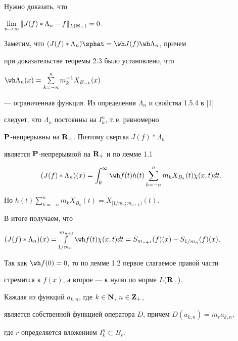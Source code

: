 \begin{pf}


Нужно доказать, что


$\lim\limits_{n\to\infty}\|J(f)*\Lambda_n-f\|_{L({\bold R}_+)}=0$.


Заметим, что $(J(f)*\Lambda_n){\sphat}={\wh J}(f){\wh\Lambda}_n$, причем 


при доказательстве теоремы 2.3 было установлено, что


${\wh\Lambda}_n(x)=\sum\limits^n_{k=-n}m_k^{-1}X_{B_{-k}}(x)$


--- ограниченная функция. Из определения $\Lambda_n$ и свойства 1.5.4 в [1] 


следует, что $\Lambda_n$ постоянны на $I^n_k$, т.\,е. равномерно 


$\bold P$-непрерывны на ${\bold R}_+$. Поэтому свертка $J(f)*\Lambda_n$ 


является $\bold P$-непрерывной на ${\bold R}_+$ и по лемме 1.1


$$


(J(f)*\Lambda_n)(x)=\int^{\infty}_0{\wh f}(t)h(t)


\sum^n_{k=-n}m_kX_{B_k}(t)\chi(x,t)dt.


$$


Но $h(t)\!\sum\limits^n_{k=-n}m_kX_{B_k}(t)=X_{[1/m_n;m_{n+1})}(t)$. 




В итоге получаем, что


$(J(f)*\Lambda_n)(x)=\int\limits^{m_{n+1}}_{1/m_n}{\wh f}(t)


\chi(x,t)dt=S_{m_{n+1}}(f)(x)-S_{1/m_n}(f)(x)$. 


Так как ${\wh f}(0)=0$, то по лемме 1.2 первое слагаемое правой части 


стремится к $f(x)$, а второе --- к нулю по норме $L({\bold R}_+)$.


\end{pf}








\begin{cors}


Каждая из функций $a_{k,n}$, где $k\in \bold N$, $n\in {\bold Z}_+$,


является собственной функцией оператора $D$, причем $D(a_{k,n})=m_ra_{k,n}$, 


где $r$ определяется вложением $I^n_k\subset B_r$.


\end{cors}








